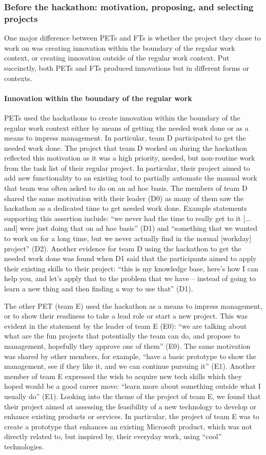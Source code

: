 \documentclass{hcij}
\begin{document}
\subsubsection{Before the hackathon: motivation, proposing, and selecting projects}
One major difference between PETs and FTs is whether the project they chose to work on was creating innovation within the boundary of the regular work context, or creating innovation outside of the regular work context. Put succinctly, both PETs and FTs produced innovations but in different forms or contexts.
\paragraph{Innovation within the boundary of the regular work}
PETs used the hackathons to create innovation within the boundary of the regular work context either by means of getting the needed work done or as a means to impress management. In particular, team D participated to get the needed work done. The project that team D worked on during the hackathon reflected this motivation as it was a high priority, needed, but non-routine work from the task list of their regular project. In particular, their project aimed to add new functionality to an existing tool to partially automate the manual work that team was often asked to do on an ad hoc basis. The members of team D shared the same motivation with their leader (D0) as many of them saw the hackathon as a dedicated time to get needed work done. Example statements supporting this assertion include: “we never had the time to really get to it [... and] were just doing that on ad hoc basis” (D1) and “something that we wanted to work on for a long time, but we never actually find in the normal [workday] project” (D2). Another evidence for team D using the hackathon to get the needed work done was found when D1 said that the participants aimed to apply their existing skills to their project: “this is my knowledge base, here's how I can help you, and let's apply that to the problem that we have – instead of going to learn a new thing and then finding a way to use that” (D1).

The other PET (team E) used the hackathon as a means to impress management, or to show their readiness to take a lead role or start a new project. This was evident in the statement by the leader of team E (E0): “we are talking about what are the fun projects that potentially the team can do, and propose to management, hopefully they approve one of them” (E0). The same motivation was shared by other members, for example, “have a basic prototype to show the management, see if they like it, and we can continue pursuing it” (E1). Another member of team E expressed the wish to acquire new tech skills which they hoped would be a good career move: “learn more about something outside what I usually do” (E1). Looking into the theme of the project of team E, we found that their project aimed at assessing the feasibility of a new technology to develop or enhance existing products or services. In particular, the project of team E was to create a prototype that enhances an existing Microsoft product, which was not directly related to, but inspired by, their everyday work, using “cool” technologies.
\end{document}

